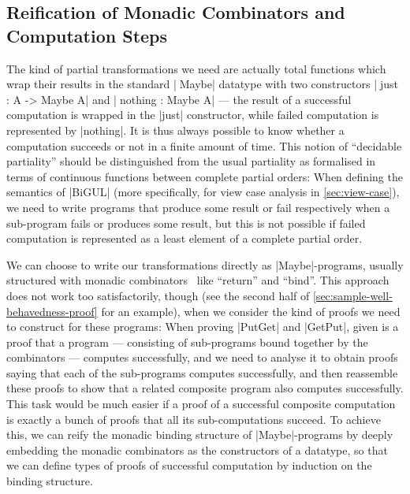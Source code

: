 \documentclass{sigplanconf}
\begin{document}
\subsection{Reification of Monadic Combinators and Computation Steps}
\label{sec:reification}

The kind of partial transformations we need are actually total functions which wrap their results in the standard |^^^Maybe| datatype with two constructors |^^^just : A -> Maybe A| and |^^^nothing  : Maybe A| --- the result of a successful computation is wrapped in the |just| constructor, while failed computation is represented by |nothing|.
It is thus always possible to know whether a computation succeeds or not in a finite amount of time.
This notion of ``decidable partiality'' should be distinguished from the usual partiality as formalised in terms of continuous functions between complete partial orders:
When defining the semantics of |BiGUL| (more specifically, for view case analysis in \autoref{sec:view-case}), we need to write programs that produce some result or fail respectively when a sub-program fails or produces some result, but this is not possible if failed computation is represented as a least element of a complete partial order.

We can choose to write our transformations directly as |Maybe|-programs, usually structured with monadic combinators~\cite{Moggi-monads,Wadler-essence} like ``return'' and ``bind''.
This approach does not work too satisfactorily, though (see the second half of \autoref{sec:sample-well-behavedness-proof} for an example), when we consider the kind of proofs we need to construct for these programs:
When proving |PutGet| and |GetPut|, given is a proof that a program --- consisting of sub-programs bound together by the combinators --- computes successfully, and we need to analyse it to obtain proofs saying that each of the sub-programs computes successfully, and then reassemble these proofs to show that a related composite program also computes successfully.
This task would be much easier if a proof of a successful composite computation is exactly a bunch of proofs that all its sub-computations succeed.
To achieve this, we can reify the monadic binding structure of |Maybe|-programs by deeply embedding the monadic combinators as the constructors of a datatype, so that we can define types of proofs of successful computation by induction on the binding structure.
\end{document}
